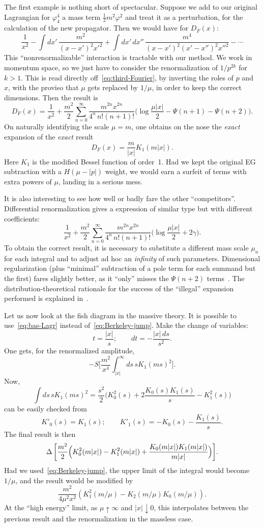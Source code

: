 \documentclass[a4paper,12pt]{article}
\newcommand{\Dl}{\Delta}           %
\newcommand{\ga}{\gamma}           %
\newcommand{\thalf}{\tfrac{1}{2}}  %
\newcommand{\7}{\dagger}           %
\theoremstyle{plain}
\theoremstyle{definition}
\begin{document}
The first example is nothing short of spectacular. Suppose we add to
our original Lagrangian for $\varphi_4^4$ a mass term
$\thalf m^2\varphi^2$ and treat it as a perturbation, for the
calculation of the new propagator. Then we would have for $D_F(x)$:
$$
\frac{1}{x^2} - \int dx'\, \frac{m^2}{(x-x')^2 {x'}^2} +
\int dx'\,dx''\, \frac{m^4}{(x-x')^2 (x'-x'')^2 {x''}^2} - \cdots
$$
This ``nonrenormalizable'' interaction is tractable with our method.
We work in momentum space, so we just have to consider the
renormalization of $1/p^{2k}$ for $k > 1$. This is read directly
off~\eqref{eq:third-Fourier}, by inverting the roles of $p$ and~$x$,
with the proviso that $\mu$ gets replaced by $1/\mu$, in order to keep
the correct dimensions. Then the result is
$$
D_F(x) = \frac{1}{x^2} +
\frac{m^2}{2} \sum_{n=0}^\infty \frac{m^{2n}x^{2n}}{4^n\,n!(n+1)!}
\biggl(\log\frac{\mu|x|}{2} - \Psi(n+1) - \Psi(n+2)\biggr).
$$
On naturally identifying the scale $\mu = m$, one obtains on the nose
the \textit{exact} expansion of the \textit{exact} result
$$
D_F(x) = \frac{m}{|x|} K_1(m|x|).
$$
Here $K_1$ is the modified Bessel function of order~1. Had we kept the
original EG subtraction with a $H(\mu - |p|)$ weight, we would earn a
surfeit of terms with extra powers of $\mu$, landing in a serious
mess.

It is also interesting to see how well or badly fare the other
``competitors''. Differential renormalization gives a expression of
similar type but with different coefficients:
$$
\frac{1}{x^2} +
\frac{m^2}{2} \sum_{n=0}^\infty \frac{m^{2n}x^{2n}}{4^n\,n!(n+1)!}
\biggl( \log\frac{\mu|x|}{2} + 2\ga \biggr).
$$
To obtain the correct result, it is necessary to substitute a
different mass scale $\mu_n$ for each integral and to adjust ad hoc an
\textit{infinity} of such parameters. Dimensional regularization (plus
``minimal'' subtraction of a pole term for each summand but the first)
fares slightly better, as it ``only'' misses the $\Psi(n+2)$
terms~\cite{NR}. The distribution-theoretical rationale for the
success of the ``illegal'' expansion performed is explained
in~\cite{NR}.

Let us now look at the fish diagram in the massive theory. It is
possible to use~\eqref{eq:bas-Lagr} instead
of~\eqref{eq:Berkeley-jump}. Make the change of variables:
$$
t = \frac{|x|}{s};  \qquad  dt = -\frac{|x|\,ds}{s^2}.
$$
One gets, for the renormalized amplitude,
$$
-S\biggl[ \frac{m^2}{x^4} \int_{|x|}^\infty ds\, s K_1(ms)^2 \biggr].
$$
Now,
$$
\int ds\, s K_1(ms)^2 = \frac{s^2}{2} \biggl(
K_0^2(s) + 2 \frac{K_0(s)K_1(s)}{s} - K^2_1(s) \biggr)
$$
can be easily checked from
$$
K'_0(s) = K_1(s);  \qquad  K'_1(s) = - K_0(s) - \frac{K_1(s)}{s}.
$$
The final result is then
$$
\Dl\,\biggl[ \frac{m^2}{2} \Bigl( K^2_0(m|x|) - K_1^2(m|x|) +
\frac{K_0(m|x|)K_1(m|x|)}{m|x|} \Bigr) \biggr].
$$
Had we used~\eqref{eq:Berkeley-jump}, the upper limit of the integral
would become $1/\mu$, and the result would be modified by
$$
\frac{m^2}{4\mu^2x^2} (K^2_1(m/\mu) - K_2(m/\mu)K_0(m/\mu)).
$$
At the ``high energy'' limit, as $\mu \uparrow \infty$ and
$|x| \downarrow 0$, this interpolates between the previous result and
the renormalization in the massless case.
\end{document}
